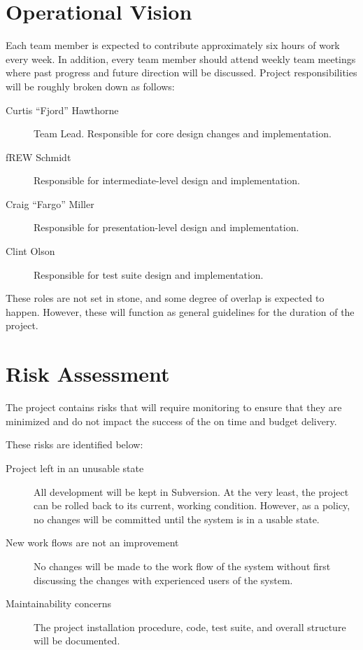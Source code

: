 \documentclass[12pt,titlepage]{article}
\begin{document}
\section{Operational Vision}
Each team member is expected to contribute approximately six hours of work every week.  In addition, every team member should attend weekly team meetings where past progress and future direction will be discussed.  Project responsibilities will be roughly broken down as follows:
\begin{description}
	\item[Curtis ``Fjord'' Hawthorne] Team Lead.  Responsible for core design changes and implementation.
	\item[fREW Schmidt] Responsible for intermediate-level design and implementation.
	\item[Craig ``Fargo'' Miller] Responsible for presentation-level design and implementation.
	\item[Clint Olson] Responsible for test suite design and implementation.
\end{description}
These roles are not set in stone, and some degree of overlap is expected to happen.  However, these will function as general guidelines for the duration of the project.
\section{Risk Assessment}
The project contains risks that will require monitoring to ensure that they are minimized and do not impact the success of the on time and budget delivery.

These risks are identified below:
\begin{description}
	\item[Project left in an unusable state] All development will be kept in Subversion.  At the very least, the project can be rolled back to its current, working condition.  However, as a policy, no changes will be committed until the system is in a usable state.
	\item[New work flows are not an improvement] No changes will be made to the work flow of the system without first discussing the changes with experienced users of the system.
	\item[Maintainability concerns] The project installation procedure, code, test suite, and overall structure will be documented.
\end{description}
\end{document}
